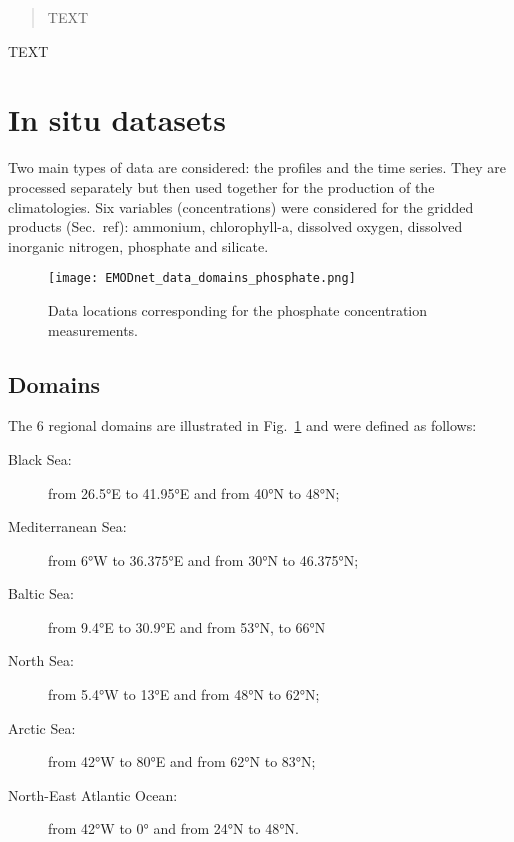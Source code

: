 \documentclass[essd, manuscript]{copernicus}
\begin{document}



\maketitle



\begin{abstract}
TEXT
\end{abstract}


\introduction  %
TEXT


\section{In situ datasets\label{sec:insitu}}
Two main types of data are considered: the profiles and the time series. They are processed separately but then used together for the production of the climatologies. Six variables (concentrations) were considered for the gridded products (Sec.~ref{}): ammonium, chlorophyll-a, dissolved oxygen, dissolved inorganic nitrogen, phosphate and silicate.



\begin{figure}[t]
\texttt{[image: EMODnet\_data\_domains\_phosphate.png]}
\caption{Data locations corresponding for the phosphate concentration measurements.\label{fig:phosphatedata}}
\end{figure}


\subsection{Domains}
The 6 regional domains are illustrated in Fig.~\ref{fig:phosphatedata} and were defined as follows:
\begin{description}
\item[Black Sea:] from 26.5°E to 41.95°E and from 40°N to 48°N;
\item[Mediterranean Sea:] from 6°W to 36.375°E and from 30°N to 46.375°N;
\item[Baltic Sea:] from 9.4°E to 30.9°E and from 53°N, to 66°N
\item[North Sea:] from 5.4°W to 13°E and from 48°N to 62°N;
\item[Arctic Sea:] from 42°W to 80°E and from 62°N to 83°N;
\item[North-East Atlantic Ocean:] from 42°W to 0° and from 24°N to 48°N.
\end{description}
\end{document}
